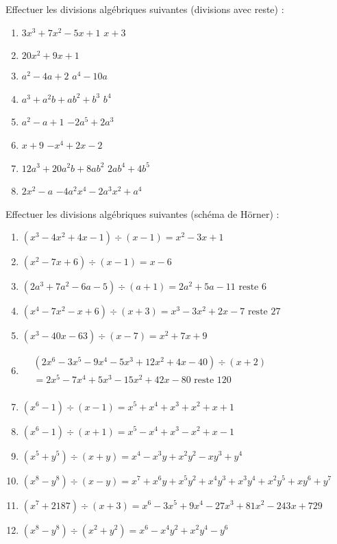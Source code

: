 \begin{solution}
Effectuer les divisions algébriques suivantes (divisions avec reste) :
\begin{multicols}{2}
\begin{enumerate}
\item $3{{x}^{3}}+7{{x}^{2}}-5x+1$	$x+3$
\item $20{{x}^{2}}+9x+1$
\item ${{a}^{2}}-4a+2$	${{a}^{4}}-10a$
\item ${{a}^{3}}+{{a}^{2}}b+a{{b}^{2}}+{{b}^{3}}$	${{b}^{4}}$	
\item ${{a}^{2}}-a+1$	 $-2{{a}^{5}}+2{{a}^{3}}$
\item $x+9$	$-{{x}^{4}}+2x-2$
\item $12{{a}^{3}}+20{{a}^{2}}b+8a{{b}^{2}}$	$2a{{b}^{4}}+4{{b}^{5}}$
\item $2{{x}^{2}}-a$	$-4{{a}^{2}}{{x}^{4}}-2{{a}^{3}}{{x}^{2}}+{{a}^{4}}$
\end{enumerate}
\end{multicols}
\end{solution}

\begin{solution}
Effectuer les divisions algébriques suivantes (schéma de Hörner) :
\begin{enumerate}
\item $({{x}^{3}}-4{{x}^{2}}+4x-1)\div (x-1)={{x}^{2}}-3x+1$
\item $({{x}^{2}}-7x+6)\div (x-1)=x-6$
\item $(2{{a}^{3}}+7{{a}^{2}}-6a-5)\div (a+1)=2{{a}^{2}}+5a-11\text{ reste 6}$
\item $({{x}^{4}}-7{{x}^{2}}-x+6)\div (x+3)={{x}^{3}}-3{{x}^{2}}+2x-7\text{ reste 27}$
\item $({{x}^{3}}-40x-63)\div (x-7)={{x}^{2}}+7x+9$
\item $\begin{array}{ll}
  & (2{{x}^{6}}-3{{x}^{5}}-9{{x}^{4}}-5{{x}^{3}}+12{{x}^{2}}+4x-40)\div (x+2) \\ 
 & =2{{x}^{5}}-7{{x}^{4}}+5{{x}^{3}}-15{{x}^{2}}+42x-80\text{ reste 120} \\ 
\end{array}$
\item $({{x}^{6}}-1)\div (x-1)={{x}^{5}}+{{x}^{4}}+{{x}^{3}}+{{x}^{2}}+x+1$
\item $({{x}^{6}}-1)\div (x+1)={{x}^{5}}-{{x}^{4}}+{{x}^{3}}-{{x}^{2}}+x-1$
\item $({{x}^{5}}+{{y}^{5}})\div (x+y)={{x}^{4}}-{{x}^{3}}y+{{x}^{2}}{{y}^{2}}-x{{y}^{3}}+{{y}^{4}}$
\item $({{x}^{8}}-{{y}^{8}})\div (x-y)={{x}^{7}}+{{x}^{6}}y+{{x}^{5}}{{y}^{2}}+{{x}^{4}}{{y}^{3}}+{{x}^{3}}{{y}^{4}}+{{x}^{2}}{{y}^{5}}+x{{y}^{6}}+{{y}^{7}}$
\item $({{x}^{7}}+2187)\div (x+3)={{x}^{6}}-3{{x}^{5}}+9{{x}^{4}}-27{{x}^{3}}+81{{x}^{2}}-243x+729$
\item $({{x}^{8}}-{{y}^{8}})\div ({{x}^{2}}+{{y}^{2}})={{x}^{6}}-{{x}^{4}}{{y}^{2}}+{{x}^{2}}{{y}^{4}}-{{y}^{6}}$
\end{enumerate}
\end{solution}

